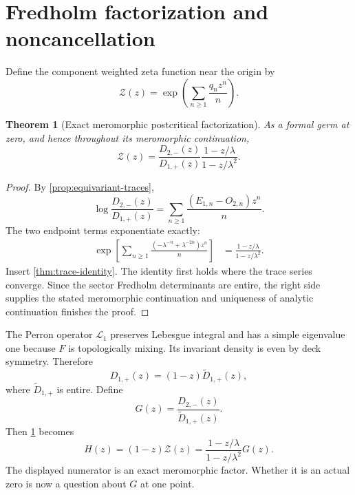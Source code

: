 \documentclass[11pt]{article}
\newtheorem{theorem}{Theorem}[section]
\theoremstyle{definition}
\theoremstyle{remark}
\newcommand{\cL}{\mathcal L}
\newcommand{\cZ}{\mathcal Z}
\begin{document}
\section{Fredholm factorization and noncancellation}
\label{sec:factorization}

Define the component weighted zeta function near the origin by
\begin{equation}\label{eq:zeta-definition}
 \cZ(z)=\exp\left(\sum_{n\ge1}\frac{q_nz^n}{n}\right).
\end{equation}

\begin{theorem}[Exact meromorphic postcritical factorization]
\label{thm:factorization}
As a formal germ at zero, and hence throughout its meromorphic continuation,
\begin{equation}\label{eq:main-factorization}
 \boxed{
 \cZ(z)=
 \frac{D_{2,-}(z)}{D_{1,+}(z)}
 \frac{1-z/\lambda}{1-z/\lambda^2}.}
\end{equation}
\end{theorem}

\begin{proof}
By \cref{prop:equivariant-traces},
\begin{equation}\label{eq:det-ratio-log}
 \log\frac{D_{2,-}(z)}{D_{1,+}(z)}
 =\sum_{n\ge1}\frac{(E_{1,n}-O_{2,n})z^n}{n}.
\end{equation}
The two endpoint terms exponentiate exactly:
\begin{align}
 \exp\left[\sum_{n\ge1}
 \frac{(-\lambda^{-n}+\lambda^{-2n})z^n}{n}\right]
 &=\frac{1-z/\lambda}{1-z/\lambda^2}.
 \label{eq:postcritical-exponential}
\end{align}
Insert \cref{thm:trace-identity}.  The identity first holds where the trace
series converge.  Since the sector Fredholm determinants are entire, the right
side supplies the stated meromorphic continuation and uniqueness of analytic
continuation finishes the proof.
\end{proof}

The Perron operator $\cL_1$ preserves Lebesgue integral and has a simple
eigenvalue one because $F$ is topologically mixing.  Its invariant density is
even by deck symmetry.  Therefore
\begin{equation}\label{eq:perron-factor}
 D_{1,+}(z)=(1-z)\widetilde D_{1,+}(z),
\end{equation}
where $\widetilde D_{1,+}$ is entire.  Define
\begin{equation}\label{eq:G-definition}
 G(z)=\frac{D_{2,-}(z)}{\widetilde D_{1,+}(z)}.
\end{equation}
Then \cref{thm:factorization} becomes
\begin{equation}\label{eq:H-factorization}
 H(z)=(1-z)\cZ(z)
 =\frac{1-z/\lambda}{1-z/\lambda^2}G(z).
\end{equation}
The displayed numerator is an exact meromorphic factor.  Whether it is an
actual zero is now a question about $G$ at one point.
\end{document}
